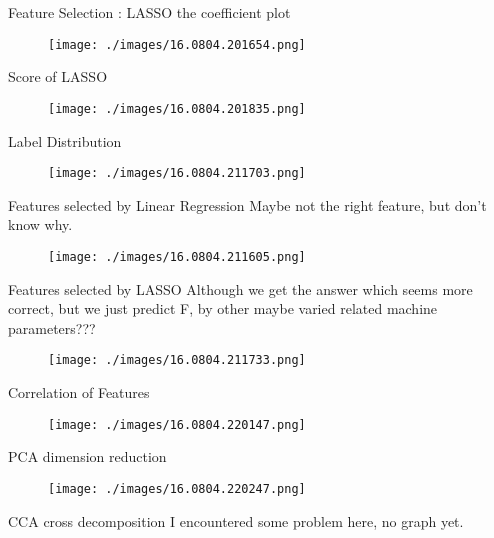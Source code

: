 \documentclass[bigger]{beamer}
\begin{document}
\begin{frame}[label=sec-5-6]{Feature Selection : LASSO}
the coefficient plot
\begin{figure}[htb]
\centering
\texttt{[image: ./images/16.0804.201654.png]}
\end{figure}
\end{frame}

\begin{frame}[label=sec-5-7]{Score of LASSO}
\begin{figure}[htb]
\centering
\texttt{[image: ./images/16.0804.201835.png]}
\end{figure}
\end{frame}

\begin{frame}[label=sec-5-8]{Label Distribution}
\begin{figure}[htb]
\centering
\texttt{[image: ./images/16.0804.211703.png]}
\end{figure}
\end{frame}
\begin{frame}[label=sec-5-9]{Features selected by Linear Regression}
Maybe not the right feature, but don't know why.
\begin{figure}[htb]
\centering
\texttt{[image: ./images/16.0804.211605.png]}
\end{figure}
\end{frame}

\begin{frame}[label=sec-5-10]{Features selected by LASSO}
Although we get the answer which seems more correct, but we just
predict F, by other maybe varied related machine parameters???
\begin{figure}[htb]
\centering
\texttt{[image: ./images/16.0804.211733.png]}
\end{figure}
\end{frame}

\begin{frame}[label=sec-5-11]{Correlation of Features}
\begin{figure}[htb]
\centering
\texttt{[image: ./images/16.0804.220147.png]}
\end{figure}
\end{frame}

\begin{frame}[label=sec-5-12]{PCA dimension reduction}
\begin{figure}[htb]
\centering
\texttt{[image: ./images/16.0804.220247.png]}
\end{figure}
\end{frame}

\begin{frame}[label=sec-5-13]{CCA cross decomposition}
I encountered some problem here, no graph yet.
\end{frame}
\end{document}
